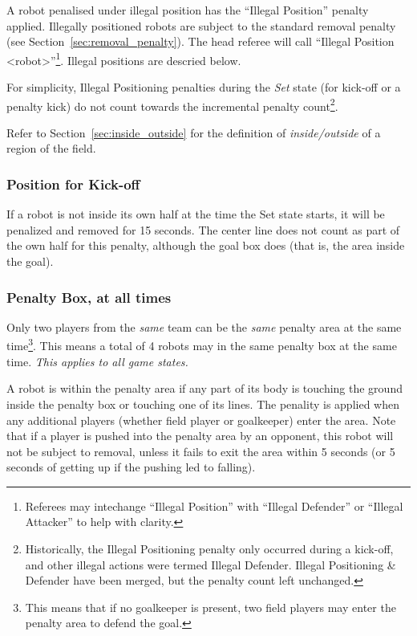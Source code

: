 \documentclass[12pt]{article}
\newcommand{\cf}{see\xspace}
\begin{document}
A robot penalised under illegal position has the ``Illegal Position'' penalty applied. Illegally positioned robots are subject to the standard removal penalty (\cf Section~\ref{sec:removal_penalty}).
The head referee will call ``Illegal Position  \textless robot\textgreater''\footnote{Referees may intechange ``Illegal Position'' with ``Illegal Defender'' or ``Illegal Attacker'' to help with clarity.}.
Illegal positions are descried below.

For simplicity, Illegal Positioning penalties during the \textit{Set} state (for kick-off or a penalty kick) do not count towards the incremental penalty count\footnote{Historically, the Illegal Positioning penalty only occurred during a kick-off, and other illegal actions were termed Illegal Defender. Illegal Positioning \& Defender have been merged, but the penalty count left unchanged.}.

Refer to Section~\ref{sec:inside_outside} for the definition of \textit{inside/outside} of a region of the field.

\subsubsection{Position for Kick-off}
If a robot is not inside its own half at the time the Set state starts, it will be penalized and removed for 15 seconds. The center line does not count as part of the own half for this penalty, although the goal box does (that is, the area inside the goal). 

\subsubsection{Penalty Box, at all times}

Only two players from the \textit{same} team can be the \textit{same} penalty area at the same time\footnote{This means that if no goalkeeper is present, two field players may enter the penalty area to defend the goal.}. This means a total of 4 robots may in the same penalty box at the same time.
\emph{This applies to all game states.}

A robot is within the penalty area if any part of its body is touching the ground inside the penalty box or touching one of its lines.  The penality is applied when any additional players (whether field player or goalkeeper) enter the area. Note that if a player is pushed into the penalty area by an opponent, this robot will not be subject to removal, unless it fails to exit the area within 5 seconds (or 5 seconds of getting up if the pushing led to falling).
\end{document}
